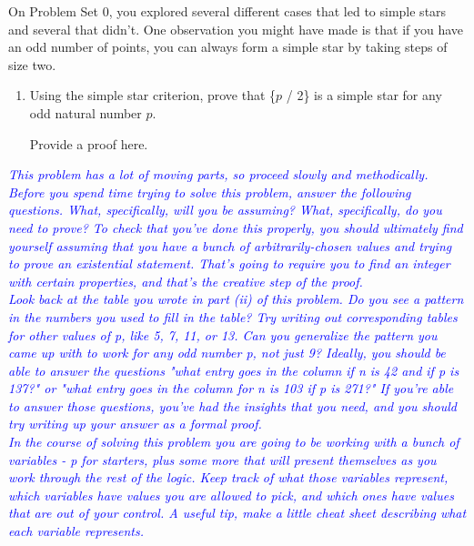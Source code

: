\documentclass{article}
\renewcommand{\(}{\left(}
\renewcommand{\)}{\right)}
\newcommand{\annotate}[1]{\textit{\textcolor{blue}{#1}}}
\theoremstyle{plain}
\theoremstyle{plain}
\theoremstyle{definition}
\begin{document}
On Problem Set 0, you explored several different cases that led to simple stars and several that didn't. One observation you might have made is that if you have an odd number of points, you can always form a simple star by taking steps of size two.

\begin{enumerate}[resume*]
    \item Using the simple star criterion, prove that \{$p$ / 2\} is a simple star for any odd natural number $p$.
    
    \begin{shaded}
    Provide a proof here.
    \end{shaded}
\end{enumerate}

\annotate{This problem has a lot of moving parts, so proceed slowly and methodically. } \\ 

\annotate{Before you spend time trying to solve this problem, answer the following questions. What, specifically, will you be assuming? What, specifically, do you need to prove? To check that you've done this properly, you should ultimately find yourself assuming that you have a bunch of arbitrarily-chosen values and trying to prove an existential statement. That's going to require you to find an integer with certain properties, and that's the creative step of the proof. } \\

\annotate{Look back at the table you wrote in part (ii) of this problem. Do you see a pattern in the numbers you used to fill in the table? Try writing out corresponding tables for other values of p, like 5, 7, 11, or 13. Can you generalize the pattern you came up with to work for any odd number p, not just 9? Ideally, you should be able to answer the questions "what entry goes in the column if n is 42 and if p is 137?" or "what entry goes in the column for n is 103 if p is 271?" If you're able to answer those questions, you've had the insights that you need, and you should try writing up your answer as a formal proof. } \\

\annotate{In the course of solving this problem you are going to be working with a bunch of variables - p for starters, plus some more that will present themselves as you work through the rest of the logic. Keep track of what those variables represent, which variables have values you are allowed to pick, and which ones have values that are out of your control. A useful tip, make a little cheat sheet describing what each variable represents.} 
\end{document}

